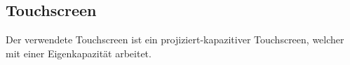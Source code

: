 \subsection{Touchscreen}

Der verwendete Touchscreen ist ein projiziert-kapazitiver Touchscreen, welcher mit einer Eigenkapazität arbeitet. \cite{ts-userManual}
